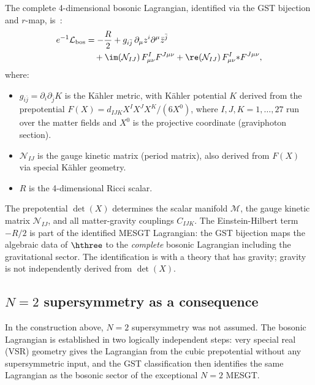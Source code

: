 The complete 4-dimensional bosonic Lagrangian, identified via the GST
bijection and $r$-map, is~\cite{deWitVanProeyen1992,
LauriaVanProeyen2020}:
\begin{align}
\label{eq:4d-lagrangian}
e^{-1}\mathcal{L}_{\mathrm{bos}} &= -\frac{R}{2}
  + g_{i\bar{j}}\,\partial_\mu z^i \partial^\mu \bar{z}^{\bar{j}}
  \nonumber\\
  &\quad + \im(\mathcal{N}_{IJ})\, F^I_{\mu\nu} F^{J\mu\nu}
  + \re(\mathcal{N}_{IJ})\, F^I_{\mu\nu} {*F}^{J\mu\nu},
\end{align}
where:
\begin{itemize}
\item $g_{i\bar{j}} = \partial_i \partial_{\bar{j}} K$ is the
  K\"ahler metric, with K\"ahler potential $K$ derived from the
  prepotential $F(X) = d_{IJK} X^I X^J X^K / (6 X^0)$, where
  $I, J, K = 1, \ldots, 27$ run over the matter fields and $X^0$ is
  the projective coordinate (graviphoton section).

\item $\mathcal{N}_{IJ}$ is the gauge kinetic matrix (period matrix),
  also derived from $F(X)$ via special K\"ahler geometry.

\item $R$ is the 4-dimensional Ricci scalar.
\end{itemize}

\begin{remark}
\label{rem:precise-claim}
The prepotential $\det(X)$ determines the scalar manifold
$\mathcal{M}$, the gauge kinetic matrix $\mathcal{N}_{IJ}$, and all
matter-gravity couplings $C_{IJK}$. The Einstein-Hilbert term $-R/2$
is part of the identified MESGT Lagrangian: the GST bijection maps the
algebraic data of $\hthree$ to the \emph{complete} bosonic Lagrangian
including the gravitational sector. The identification is with a theory
that has gravity; gravity is not independently derived from $\det(X)$.
\end{remark}

\subsection{$N{=}2$ supersymmetry as a consequence}
\label{sec:n2-derived}

In the construction above, $N{=}2$ supersymmetry was not assumed.
The bosonic Lagrangian is established in two logically independent
steps: very special real (VSR) geometry gives the Lagrangian from the
cubic prepotential without any supersymmetric input, and the GST
classification then identifies the same Lagrangian as the bosonic
sector of the exceptional $N{=}2$ MESGT.

